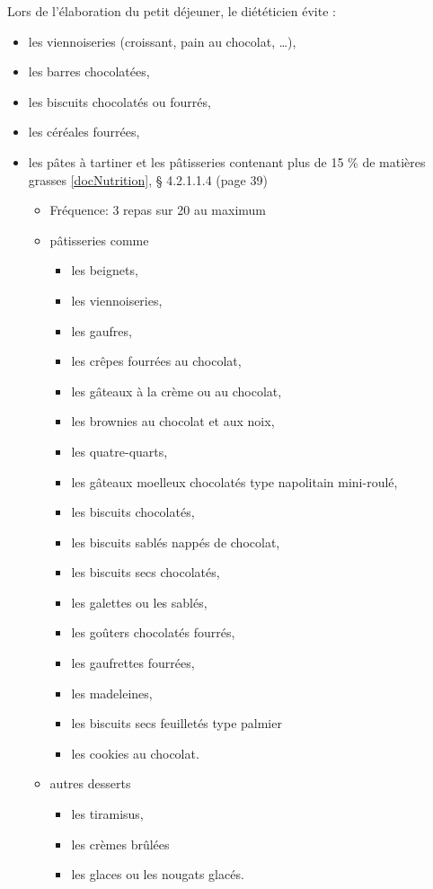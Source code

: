 Lors de l'élaboration du petit déjeuner, le diététicien évite :
 \begin{itemize}
  \item les viennoiseries (croissant, pain au chocolat, …),
  \item les barres chocolatées,
  \item les biscuits chocolatés ou fourrés,
  \item les céréales fourrées,
  \item les pâtes à tartiner et les pâtisseries contenant plus de 15 \% de matières grasses \ref{docNutrition}, § 4.2.1.1.4 (page 39)
  \begin{itemize}
   \item Fréquence: 3 repas sur 20 au maximum
   \item pâtisseries comme
   \begin{itemize}
    \item les beignets,
    \item les viennoiseries,
    \item les gaufres,
    \item les crêpes fourrées au chocolat,
    \item les gâteaux à la crème ou au chocolat,
    \item les brownies au chocolat et aux noix,
    \item les quatre-quarts,
    \item les gâteaux moelleux chocolatés type napolitain mini-roulé,
    \item les biscuits chocolatés,
    \item les biscuits sablés nappés de chocolat,
    \item les biscuits secs chocolatés,
    \item les galettes ou les sablés,
    \item les goûters chocolatés fourrés,
    \item les gaufrettes fourrées,
    \item les madeleines,
    \item les biscuits secs feuilletés type palmier
    \item les cookies au chocolat.
   \end{itemize}
   \item autres desserts
   \begin{itemize}
    \item les tiramisus,
    \item les crèmes brûlées
    \item les glaces ou les nougats glacés.
   \end{itemize}
  \end{itemize}
 \end{itemize}

